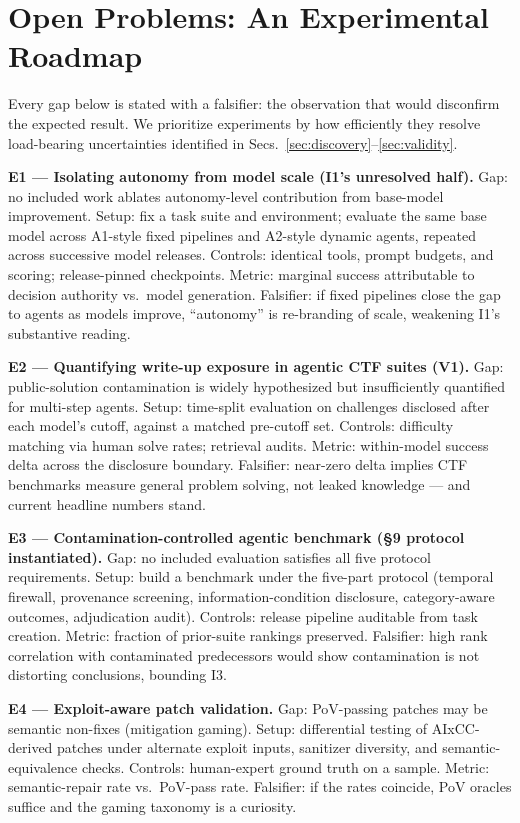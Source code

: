 \documentclass[conference,compsoc]{IEEEtran}
\begin{document}
\section{Open Problems: An Experimental Roadmap}
\label{sec:roadmap}

Every gap below is stated with a falsifier: the observation that would disconfirm the
expected result. We prioritize experiments by how efficiently they resolve load-bearing
uncertainties identified in Secs.~\ref{sec:discovery}--\ref{sec:validity}.

\textbf{E1 --- Isolating autonomy from model scale (I1's unresolved half).}
Gap: no included work ablates autonomy-level contribution from base-model improvement.
Setup: fix a task suite and environment; evaluate the same base model across A1-style fixed
pipelines and A2-style dynamic agents, repeated across successive model releases.
Controls: identical tools, prompt budgets, and scoring; release-pinned checkpoints.
Metric: marginal success attributable to decision authority vs.\ model generation.
Falsifier: if fixed pipelines close the gap to agents as models improve, ``autonomy'' is
re-branding of scale, weakening I1's substantive reading.

\textbf{E2 --- Quantifying write-up exposure in agentic CTF suites (V1).}
Gap: public-solution contamination is widely hypothesized but insufficiently quantified for multi-step
agents. Setup: time-split evaluation on challenges disclosed after each model's cutoff, against
a matched pre-cutoff set. Controls: difficulty matching via human solve rates; retrieval
audits. Metric: within-model success delta across the disclosure boundary.
Falsifier: near-zero delta implies CTF benchmarks measure general problem solving, not leaked
knowledge --- and current headline numbers stand.

\textbf{E3 --- Contamination-controlled agentic benchmark (§9 protocol instantiated).}
Gap: no included evaluation satisfies all five protocol requirements.
Setup: build a benchmark under the five-part protocol (temporal firewall, provenance
screening, information-condition disclosure, category-aware outcomes, adjudication audit).
Controls: release pipeline auditable from task creation. Metric: fraction of prior-suite
rankings preserved. Falsifier: high rank correlation with contaminated predecessors would show
contamination is not distorting conclusions, bounding I3.

\textbf{E4 --- Exploit-aware patch validation.}
Gap: PoV-passing patches may be semantic non-fixes (mitigation gaming). Setup: differential
testing of AIxCC-derived patches under alternate exploit inputs, sanitizer diversity, and
semantic-equivalence checks. Controls: human-expert ground truth on a sample. Metric:
semantic-repair rate vs.\ PoV-pass rate. Falsifier: if the rates coincide, PoV oracles suffice
and the gaming taxonomy is a curiosity.
\end{document}
